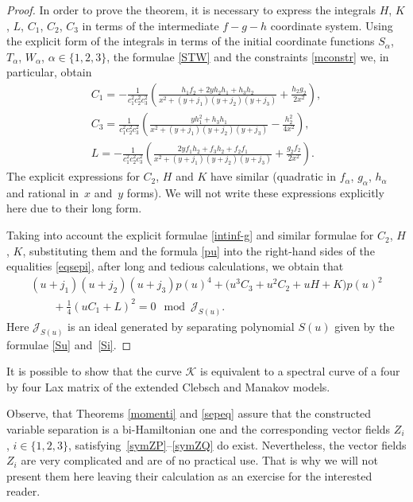 \documentclass[10pt,a4paper]{amsart}
\def\a{\alpha}
\numberwithin{equation}{section}
\begin{document}
\begin{proof}
In order to prove the theorem, it is necessary to express the integrals $H$, $K$, $L$, $C_1$, $C_2$, $C_3$ in terms of the intermediate $f-g-h$ coordinate system. %
 Using the explicit form of the integrals in terms of the initial coordinate functions $S_{\a}$, $T_{\a}$, $W_{\a}$, $\a\in \{1,2,3\}$, the formulae \eqref{STW} and the constraints \eqref{mconstr} we, in particular, obtain
\begin{subequations}\label{intinf-g}
\begin{gather}
C_1= -\frac{1}{c_1^2 c_2^2 c_3^2 }\left( \frac{h_1 f_2+ 2 y h_2 h_1+h_3 h_2}{x^2+(y+j_1)(y+j_2)(y+j_3)}+\frac{h_2 g_2}{2 x^2}\right),\label{intinf-g-1}
\\
C_3=\frac{1}{c_1^2 c_2^2 c_3^2 }\left( \frac{ y h_1^2+h_3 h_1}{x^2+(y+j_1)(y+j_2)(y+j_3)} - \frac{h_2^2}{4 x^2} \right),\label{intinf-g-3}
\\
L= -\frac{1}{c_1^2 c_2^2 c_3^2 }\left( \frac{ 2yf_1 h_2+f_3h_2+f_2 f_1}{x^2+(y+j_1)(y+j_2)(y+j_3)}+\frac{g_2 f_2}{2 x^2}\right).
\end{gather}
\end{subequations}
 The explicit expressions for $C_2$, $H$ and $K$ have similar (quadratic in $f_{\a}$, $g_{\a}$, $h_{\a}$ and rational in~$x$ and~$y$ forms). We will not write these expressions explicitly here due to their long form.


Taking into account the explicit formulae
\eqref{intinf-g} and similar formulae for $C_2$, $H$, $K$, substituting them and the formula \eqref{pu} into the right-hand sides of the equalities \eqref{eqsepi}, after long and tedious calculations, we obtain that
\begin{gather*}%
(u+j_1)(u+j_2)(u+j_3) p(u)^4+\big(u^3 C_3+u^2 C_2+ u H+K \big) p(u)^2\\
\qquad {}+ \frac{1}{4}(u C_1+L)^2=0 \mod \mathcal{J}_{S(u)}.
\end{gather*}
Here $\mathcal{J}_{S(u)}$ is an ideal generated by separating polynomial $S(u)$ given by the formulae \eqref{Su} and~\eqref{Si}.
\end{proof}

\begin{Remark}
 It is possible to show that the curve $\mathcal{K}$ is equivalent to a spectral curve of a four by four Lax matrix of the extended Clebsch and Manakov models.
\end{Remark}



\begin{Remark}
 Observe, that Theorems \ref{momenti} and \ref{sepeq} assure that the constructed variable separation is a bi-Hamiltonian one and the corresponding vector fields $Z_i$, $i\in \{1,2,3\}$, satisfying~\eqref{symZP}--\eqref{symZQ} do exist.
Nevertheless, the vector fields $Z_i$ are very complicated and are of no practical use. That is why we will not present them here leaving their calculation as an exercise for the interested reader.
\end{Remark}
\end{document}
